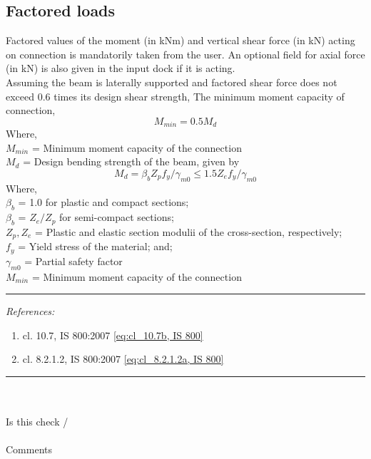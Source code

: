 \documentclass[11.5pt,a4paper,oneside]{report}
\newcommand{\okornot}{ \vspace{15mm} \hrule
	\noindent \\ \\
	Is this check \qquad
	\CheckBox[checked=False, name= ok]{\textbf{Ok}} \qquad / 
	\CheckBox[checked=False, name= notok]{\textbf{Not Ok}}\\ \\
	Comments \\ \\
	\noindent
	\TextField[name=multilinetextbox, multiline=true, width=1.0\linewidth,height=2in]{}}
\newcommand{\checkrefernces} {
	\vspace{15mm} \hrule \vspace{2mm}
	\textit{References:}}
\begin{document}
\begin{Form}
\chapter{Factored loads}
%
Factored values of the moment (in kNm) and vertical shear force  (in kN) acting on connection is mandatorily taken from the user. An optional field for axial force (in kN) is also given in the input dock if it is acting.\\
Assuming the beam is laterally supported and factored shear force does not exceed 0.6 times its design shear strength, 
The minimum moment capacity of connection,
\begin{equation}\label{eq:cl_10.7b, IS 800}
	M_{min} = 0.5 M_d 
\end{equation}
Where, \\
\indent $M_{min}$ = Minimum moment capacity of the connection \\
\indent $M_d$ = Design bending strength of the beam, given by
\begin{equation} \label{eq:cl_8.2.1.2a, IS 800}
M_d = \beta_b Z_p f_y / \gamma_{m0} \le 1.5 Z_e f_y / \gamma_{m0} 
\end{equation}
Where, \\
\indent $\beta_b$ = 1.0 for plastic and compact sections;\\
\indent $\beta_b$ = $Z_e/Z_p$ for semi-compact sections;\\
\indent $Z_p, Z_e$ = Plastic and elastic section modulii of the cross-section, respectively; \\
\indent $f_y$ = Yield stress of the material; and;\\
\indent $\gamma_{m0}$ = Partial safety factor \\
\indent $M_{min}$ = Minimum moment capacity of the connection



\checkrefernces
\begin{enumerate}
	\item cl. 10.7, IS 800:2007 \eqref{eq:cl_10.7b, IS 800} 
	\item cl. 8.2.1.2, IS 800:2007 \eqref{eq:cl_8.2.1.2a, IS 800} 
\end{enumerate}
\okornot

\end{Form}
\end{document}
